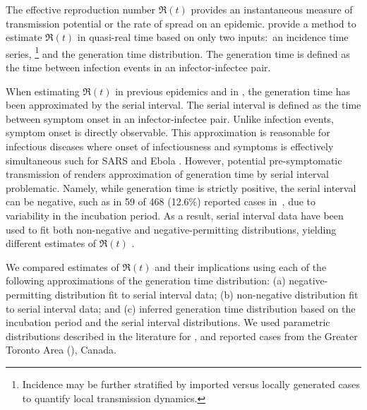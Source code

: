 The effective reproduction number $\Re(t)$ provides
an instantaneous measure of transmission potential
or the rate of spread on an epidemic.
\textcite{Cori2013} provide a method to estimate $\Re(t)$
in quasi-real time based on only two inputs:\
an incidence time series,%
\footnote{Incidence may be further stratified by
  imported versus locally generated cases
  to quantify local transmission dynamics.}
and the generation time distribution.
The generation time is defined as
the time between infection events in an infector-infectee pair.
\par
When estimating $\Re(t)$
in previous epidemics \cite{Cori2013,Ali2013,Aylward2014}
and in \covid \cite{Pan2020,Cowling2020,Leung2020,Liu2020},
the generation time has been approximated by the serial interval.
The serial interval is defined as
the time between symptom onset in an infector-infectee pair.
Unlike infection events, symptom onset is directly observable.
This approximation is reasonable for infectious diseases
where onset of infectiousness and symptoms
is effectively simultaneous \cite{Cori2013}
such for SARS and Ebola \cite{Zeng2009,Osterholm2015}.
However, potential pre-symptomatic transmission of \covid
\cite{Kimball2020,Du2020}
renders approximation of generation time by serial interval problematic.
Namely, while generation time is strictly positive,
the serial interval can be negative,
such as in 59 of 468 (12.6\%) reported cases in~\cite{Du2020},
due to variability in the incubation period.
As a result, \covid serial interval data have been used to fit both
non-negative and negative-permitting distributions,
yielding different estimates of $\Re(t)$
\cite{Du2020,Zhang2020,Ganyani2020}.
\par
We compared estimates of $\Re(t)$ and their implications using
each of the following approximations of the generation time distribution:
(a) negative-permitting distribution fit to serial interval data;
(b) non-negative distribution fit to serial interval data; and
(c) inferred generation time distribution based on
the incubation period and the serial interval distributions.
We used parametric distributions described in the literature for \covid,
and reported cases from the Greater Toronto Area (\gta), Canada.